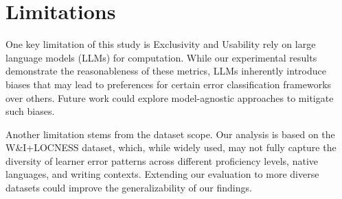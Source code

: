 \section*{Limitations}
One key limitation of this study is Exclusivity and Usability rely on large language models (LLMs) for computation. While our experimental results demonstrate the reasonableness of these metrics, LLMs inherently introduce biases that may lead to preferences for certain error classification frameworks over others. Future work could explore model-agnostic approaches to mitigate such biases.

Another limitation stems from the dataset scope. Our analysis is based on the W\&I+LOCNESS dataset, which, while widely used, may not fully capture the diversity of learner error patterns across different proficiency levels, native languages, and writing contexts. Extending our evaluation to more diverse datasets could improve the generalizability of our findings.
